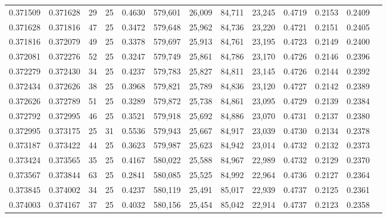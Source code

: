 \begin{tabular}{rrrrrrrrrrrrr}
0.371509 & 0.371628 &    29 &  25 &                                     0.4630 & 579,601 &  26,009 &  84,711 &  23,245 & 0.4719 & 0.2153 & 0.2409 \\
0.371628 & 0.371816 &    47 &  25 &                                     0.3472 & 579,648 &  25,962 &  84,736 &  23,220 & 0.4721 & 0.2151 & 0.2405 \\
0.371816 & 0.372079 &    49 &  25 &                                     0.3378 & 579,697 &  25,913 &  84,761 &  23,195 & 0.4723 & 0.2149 & 0.2400 \\
0.372081 & 0.372276 &    52 &  25 &                                     0.3247 & 579,749 &  25,861 &  84,786 &  23,170 & 0.4726 & 0.2146 & 0.2396 \\
0.372279 & 0.372430 &    34 &  25 &                                     0.4237 & 579,783 &  25,827 &  84,811 &  23,145 & 0.4726 & 0.2144 & 0.2392 \\
0.372434 & 0.372626 &    38 &  25 &                                     0.3968 & 579,821 &  25,789 &  84,836 &  23,120 & 0.4727 & 0.2142 & 0.2389 \\
0.372626 & 0.372789 &    51 &  25 &                                     0.3289 & 579,872 &  25,738 &  84,861 &  23,095 & 0.4729 & 0.2139 & 0.2384 \\
0.372792 & 0.372995 &    46 &  25 &                                     0.3521 & 579,918 &  25,692 &  84,886 &  23,070 & 0.4731 & 0.2137 & 0.2380 \\
0.372995 & 0.373175 &    25 &  31 &                                     0.5536 & 579,943 &  25,667 &  84,917 &  23,039 & 0.4730 & 0.2134 & 0.2378 \\
0.373187 & 0.373422 &    44 &  25 &                                     0.3623 & 579,987 &  25,623 &  84,942 &  23,014 & 0.4732 & 0.2132 & 0.2373 \\
0.373424 & 0.373565 &    35 &  25 &                                     0.4167 & 580,022 &  25,588 &  84,967 &  22,989 & 0.4732 & 0.2129 & 0.2370 \\
0.373567 & 0.373844 &    63 &  25 &                                     0.2841 & 580,085 &  25,525 &  84,992 &  22,964 & 0.4736 & 0.2127 & 0.2364 \\
0.373845 & 0.374002 &    34 &  25 &                                     0.4237 & 580,119 &  25,491 &  85,017 &  22,939 & 0.4737 & 0.2125 & 0.2361 \\
0.374003 & 0.374167 &    37 &  25 &                                     0.4032 & 580,156 &  25,454 &  85,042 &  22,914 & 0.4737 & 0.2123 & 0.2358 \\

\end{tabular}
